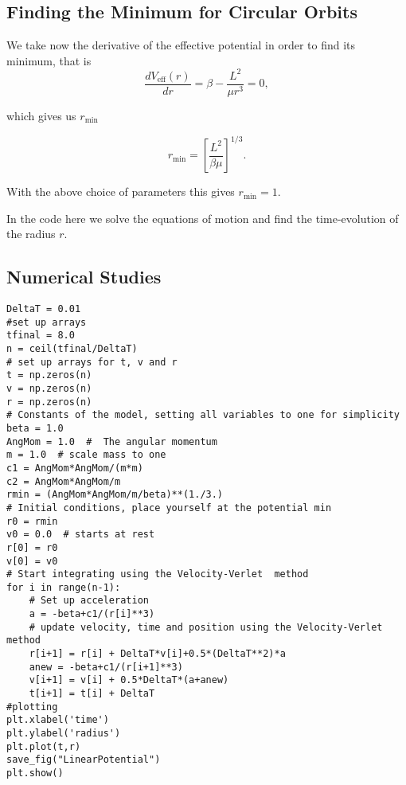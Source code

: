 \documentclass[%
oneside,                 %
final,                   %
10pt]{article}
\begin{document}
\subsection*{Finding the Minimum for Circular Orbits}

We take now the derivative of the effective potential in order to find its minimum, that is
\[
\frac{dV_{\mathrm{eff}}(r)}{dr} = \beta-\frac{L^2}{\mu r^3}=0,
\]

which gives us $r_{\mathrm{min}}$

\[
r_{\mathrm{min}}=\left [\frac{L^2}{\beta \mu}\right ]^{1/3}.
\]

With the above choice of parameters this gives $r_{\mathrm{min}}=1$. 

In the code here we solve the equations of motion and find the time-evolution of the radius $r$.

\subsection*{Numerical Studies}






































\begin{verbatim}
DeltaT = 0.01
#set up arrays 
tfinal = 8.0
n = ceil(tfinal/DeltaT)
# set up arrays for t, v and r
t = np.zeros(n)
v = np.zeros(n)
r = np.zeros(n)
# Constants of the model, setting all variables to one for simplicity
beta = 1.0
AngMom = 1.0  #  The angular momentum
m = 1.0  # scale mass to one
c1 = AngMom*AngMom/(m*m)
c2 = AngMom*AngMom/m
rmin = (AngMom*AngMom/m/beta)**(1./3.)
# Initial conditions, place yourself at the potential min
r0 = rmin
v0 = 0.0  # starts at rest
r[0] = r0
v[0] = v0
# Start integrating using the Velocity-Verlet  method
for i in range(n-1):
    # Set up acceleration
    a = -beta+c1/(r[i]**3)
    # update velocity, time and position using the Velocity-Verlet method
    r[i+1] = r[i] + DeltaT*v[i]+0.5*(DeltaT**2)*a
    anew = -beta+c1/(r[i+1]**3)
    v[i+1] = v[i] + 0.5*DeltaT*(a+anew)
    t[i+1] = t[i] + DeltaT
#plotting
plt.xlabel('time')
plt.ylabel('radius')
plt.plot(t,r)
save_fig("LinearPotential")
plt.show()


\end{verbatim}
\end{document}
